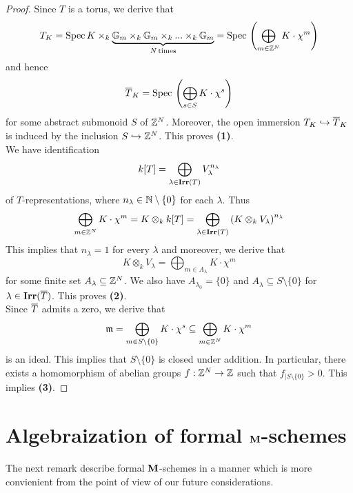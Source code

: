 \begin{proof}
Since $T$ is a torus, we derive that
$$T_K = \mathrm{Spec}\, K \times_k \underbrace{\mathbb{G}_{m}\times_k \mathbb{G}_{m}\times_k ...\times_k \mathbb{G}_{m}}_{N\,\mathrm{times}} = \mathrm{Spec}\, \left(\bigoplus_{m\in {\mathbb Z}^N}K\cdot \chi^m\right)$$
and hence
$$\overline{T}_K = \mathrm{Spec}\, \left(\bigoplus_{s\in S}K\cdot \chi^s\right)$$
for some abstract submonoid $S$ of ${\mathbb Z}^N$. Moreover, the open immersion $T_K\hookrightarrow \overline{T}_K$ is induced by the inclusion $S \hookrightarrow {\mathbb Z}^N$. This proves \textbf{(1)}.\\
We have identification
$$k[T] = \bigoplus_{\lambda\in \mathbf{Irr}(T)}V_{\lambda}^{n_{\lambda}}$$
of $T$-representations, where $n_{\lambda}\in {\mathbb N}\setminus \{0\}$ for each $\lambda$. Thus
$$\bigoplus_{m\in {\mathbb Z}^N}K\cdot \chi^m = K\otimes_kk[T] = \bigoplus_{\lambda\in \mathbf{Irr}(T)}\left(K\otimes_kV_{\lambda}\right)^{n_{\lambda}}$$
This implies that $n_{\lambda} = 1$ for every $\lambda$ and moreover, we derive that
$$K\otimes_kV_{\lambda} = \bigoplus_{m\in A_{\lambda}}K\cdot \chi^m$$
for some finite set $A_{\lambda}\subseteq {\mathbb Z}^N$. We also have $A_{\lambda_0} = \{0\}$ and $A_{\lambda}\subseteq S\setminus \{0\}$ for $\lambda \in \mathbf{Irr}(\overline{T})$. This proves \textbf{(2)}.\\
Since $\overline{T}$ admits a zero, we derive that
$$\mathfrak{m} = \bigoplus_{m \in S\setminus\{0\}}K\cdot \chi^s \subseteq \bigoplus_{m\in {\mathbb Z}^N}K\cdot \chi^m$$
is an ideal. This implies that $S\setminus \{0\}$ is closed under addition. In particular, there exists a homomorphism of abelian groups $f:{\mathbb Z}^N\rightarrow {\mathbb Z}$ such that $f_{\mid S\setminus \{0\}}>0$. This implies \textbf{(3)}.
\end{proof}

\section{Algebraization of formal $\mathbf{M}$-schemes}
\noindent
The next remark describe formal $\mathbf{M}$-schemes in a manner which is more convienient from the point of view of our future considerations. 

